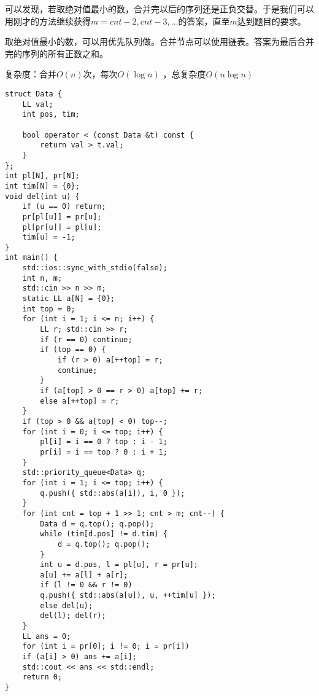\documentclass[E:/GsjzTle/main/main.tex]{subfiles}
\begin{document}
\begin{enumerate}
  可以发现，若取绝对值最小的数，合并完以后的序列还是正负交替。于是我们可以用刚才的方法继续获得\(m=cnt-2,cnt-3,\dots\)的答案，直至\(m\)达到题目的要求。

  取绝对值最小的数，可以用优先队列做。合并节点可以使用链表。答案为最后合并完的序列的所有正数之和。

  复杂度：合并\(O(n)\)次，每次\(O(\log n)\) ，总复杂度\(O(n\log n)\)

\begin{lstlisting}
struct Data {
	LL val;
	int pos, tim;
	
	bool operator < (const Data &t) const {
		return val > t.val;
	}
};
int pl[N], pr[N];
int tim[N] = {0};
void del(int u) {
	if (u == 0) return;
	pr[pl[u]] = pr[u];
	pl[pr[u]] = pl[u];
	tim[u] = -1;
}
int main() {
	std::ios::sync_with_stdio(false);
	int n, m;
	std::cin >> n >> m;
	static LL a[N] = {0};
	int top = 0;
	for (int i = 1; i <= n; i++) {
		LL r; std::cin >> r;
		if (r == 0) continue;
		if (top == 0) {
			if (r > 0) a[++top] = r;
			continue;
		}
		if (a[top] > 0 == r > 0) a[top] += r;
		else a[++top] = r;
	}
	if (top > 0 && a[top] < 0) top--;   
	for (int i = 0; i <= top; i++) {
		pl[i] = i == 0 ? top : i - 1;
		pr[i] = i == top ? 0 : i + 1;
	}
	std::priority_queue<Data> q;
	for (int i = 1; i <= top; i++) {
		q.push({ std::abs(a[i]), i, 0 });
	}   
	for (int cnt = top + 1 >> 1; cnt > m; cnt--) {
		Data d = q.top(); q.pop();
		while (tim[d.pos] != d.tim) {
			d = q.top(); q.pop();
		}
		int u = d.pos, l = pl[u], r = pr[u];
		a[u] += a[l] + a[r];
		if (l != 0 && r != 0)
		q.push({ std::abs(a[u]), u, ++tim[u] });
		else del(u);
		del(l); del(r);
	} 
	LL ans = 0;
	for (int i = pr[0]; i != 0; i = pr[i])
	if (a[i] > 0) ans += a[i];
	std::cout << ans << std::endl;
	return 0;
}
\end{lstlisting}
\end{enumerate}
\end{document}
